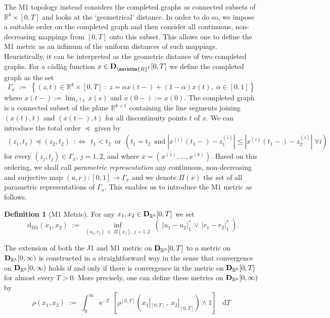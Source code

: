 \documentclass[11pt]{article}
\theoremstyle{definition}\newtheorem{example}[theorem]{Example}
\theoremstyle{definition}\newtheorem{counterexample}[theorem]{Counterexample}
\theoremstyle{definition}\newtheorem{remark}[theorem]{Remark}
\theoremstyle{definition}\newtheorem{defi}[theorem]{Definition}
\numberwithin{equation}{section}
\newcommand{\e}{\operatorname{e}}
\newcommand{\R}{\mathbb{R}}
\newcommand{\D}{{\bf D}}											%
\newcommand*\diff{\mathop{}\!\mathrm{d}}								%
\renewcommand{\|}{\; : \, \;}											%
\newcommand{\dM}{\diff_{\operatorname{M1}}}							%
\begin{document}
The M1 topology instead considers the completed graphs as connected subsets of $\R^{k} \times [0,T]$ and looks at the `geometrical' distance. In order to do so, we impose a suitable order on the completed graph and then consider all continuous, non-decreasing mappings from $[0,T]$ onto this subset. This allows one to define the M1 metric as an infimum of the uniform distances of such mappings. Heuristically, it can be interpreted as the geometric distance of two completed graphs. For a càdlàg function $x \in \D_{\mathbbm{R}^k}[0,T]$ we define the completed graph as the set
$$ \Gamma_x \; := \; \left\{ (z,t) \in \R^k \times [0,T] \; : \; z = \alpha x(t-) + (1-\alpha) x(t), \; \alpha \in [0,1]\right\}$$
where $x(t-):= \lim_{s \uparrow t} \, x(s)$ and $x(0-):=x(0)$.
The completed graph is a connected subset of the plane $\R^{k+1}$ containing the line segments joining $(x(t),t)$ and $(x(t-),t)$ for all discontinuity points $t$ of $x$.  We can introduce the total order $\preceq$ given by
\begin{align*}\label{def:M1_metric}
	(z_1, t_1)  \preceq (z_2, t_2) \;\, :\Leftrightarrow \;\, t_1 < t_2  \;\; \text{or} \; \,  \left(  t_1=t_2 \;\, \text{and} \; |x^{(i)}(t_1-)-z_1^{(i)}|  \le  |x^{(i)}(t_1-)-z_2^{(i)}|\; \forall i\right)
\end{align*}
for every $(z_j,t_j) \in \Gamma_x$, $j=1,2$, and where $x=(x^{(1)},...,x^{(k)})$. Based on this ordering, we shall call \textit{parametric representation} any continuous, non-decreasing and surjective map $(u,r):[0,1] \to \Gamma_x$ and we denote $\Pi(x)$ the set of all parametric representations of $\Gamma_x$. This enables us to introduce the M1 metric as follows.
\begin{defi}[M1 Metric]\label{def:M1_metric} For any $x_1, x_2 \in \D_{\R^k}[0,T]$ we set
	$$\dM(x_1,x_2) \; := \; \underset{(u_j,r_j) \; \in \; \Pi(x_j),\, j=1,2}{\operatorname{inf}} \; \left( \;  |u_1-u_2|_1^* \, \vee \, |r_1-r_2|^*_1 \; \right). $$
\end{defi}
The extension of both the J1 and M1 metric on $\D_{\R^k}[0,T]$ to a metric on $\D_{\R^k}[0,\infty)$ is constructed in a straightforward way in the sense that convergence on $\D_{\R^k}[0,\infty)$ holds if and only if there is convergence in the metric on $\D_{\R^k}[0,T]$ for almost every $T>0$.  More precisely, one can define these metrics on $\D_{\R^k}[0,\infty)$ by
\begin{equation} \rho(x_1,x_2) \; := \; \int_0^\infty \; \e^{-T}\, \left[\rho^{[0,T]}\left(x_1|_{[0,T]}\, ,\, x_2|_{[0,T]}\right) \wedge 1\right] \; \diff T \label{eq:M1_metric_real_line}
\end{equation}
\end{document}
